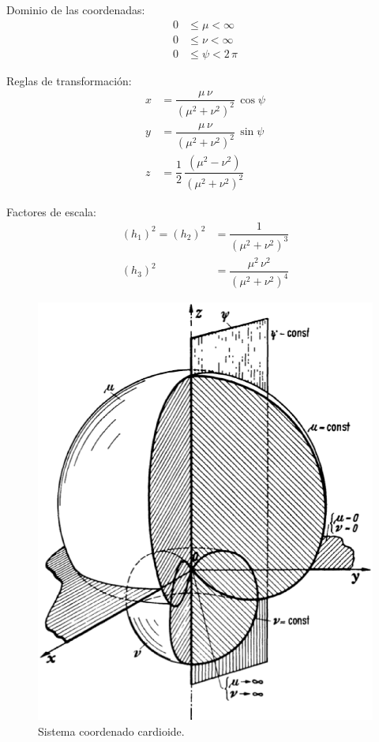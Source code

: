 Dominio de las coordenadas:
\begin{align*}
0 &\leq \mu < \infty \\
0 &\leq \nu < \infty \\
0 &\leq \psi < 2 \, \pi
\end{align*}

Reglas de transformación:
\begin{align*}
x &= \dfrac{\mu \, \nu}{(\mu^{2} + \nu^{2})^{2}} \, \cos \psi \\[0.5em]
y &= \dfrac{\mu \, \nu}{(\mu^{2} + \nu^{2})^{2}} \, \sin \psi \\[0.5em]
z &= \dfrac{1}{2} \, \dfrac{(\mu^{2} - \nu^{2})}{(\mu^{2} + \nu^{2})^{2}}
\end{align*}

Factores de escala:
\begin{align*}
(h_{1})^{2} = (h_{2})^{2} &= \dfrac{1}{(\mu^{2} + \nu^{2})^{3}} \\[0.5em]
(h_{3})^{2} &= \dfrac{\mu^{2} \, \nu^{2}}{(\mu^{2} + \nu^{2})^{4}}
\end{align*}

\begin{figure}[H]
    \centering
    \includegraphics[scale=0.5]{Imagenes/Sistema_Cardioide.eps}
    \caption{Sistema coordenado cardioide.}
\end{figure}

